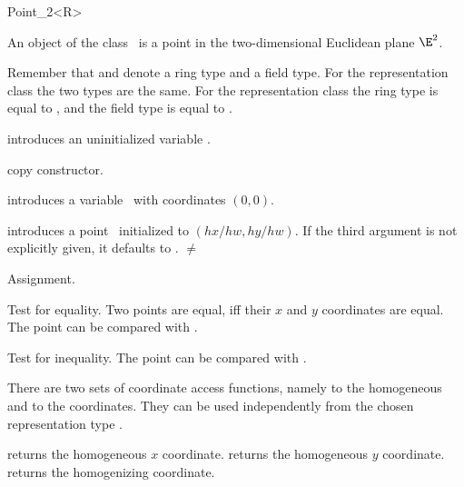 \begin{ccRefClass} {Point_2<R>}

\ccDefinition
An object of the class \ccRefName\ is a point in the two-dimensional
Euclidean plane $\E^2$. 

Remember that  and  denote a ring type
and a field type. For the representation class
 the two types are the same. For the
representation class  the ring type
 is equal to , and the field type  is 
equal to .

\ccCreation
{}


\ccHidden {}
             {introduces an uninitialized variable \ccVar.}

\ccHidden {}
 	    {copy constructor.}

            {introduces a variable \ccVar\ with  coordinates
	      $(0,0)$.}

            {introduces a point \ccVar\ initialized to $(hx/hw,hy/hw)$.
             If the third argument is not explicitly given, it defaults
             to .
	     \ccPrecond {} $\neq$  }


\ccOperations

\ccHidden {}
        {Assignment.}

       {Test for equality. Two points are equal, iff their $x$ and $y$ 
        coordinates are equal. The point can be compared with
		.}

       {Test for inequality. The point can be compared with .}

There are two sets of coordinate access functions, namely to the
homogeneous and to the  coordinates. They can be used
independently from the chosen representation type .

       {returns the homogeneous $x$ coordinate.}
\ccGlue
{}
       {returns the homogeneous $y$ coordinate.}
\ccGlue
{}
       {returns the homogenizing  coordinate.}


\end{ccRefClass}
